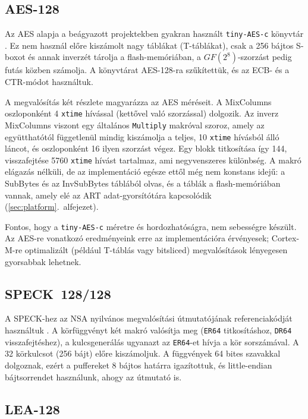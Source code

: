 \documentclass[a4paper,12pt]{report}
\theoremstyle{definition}
\theoremstyle{remark}
\begin{document}
\subsection{AES-128}

Az AES alapja a beágyazott projektekben gyakran használt \texttt{tiny-AES-c} könyvtár \cite{TinyAES}. Ez nem használ előre kiszámolt nagy táblákat (T-táblákat), csak a 256 bájtos S-boxot és annak inverzét tárolja a flash-memóriában, a $GF(2^8)$-szorzást pedig futás közben számolja. A könyvtárat AES-128-ra szűkítettük, és az ECB- és a CTR-módot használtuk.

A megvalósítás két részlete magyarázza az AES méréseit. A MixColumns oszloponként 4 \texttt{xtime} hívással (kettővel való szorzással) dolgozik. Az inverz MixColumns viszont egy általános \texttt{Multiply} makróval szoroz, amely az együtthatótól függetlenül mindig kiszámolja a teljes, 10 \texttt{xtime} hívásból álló láncot, és oszloponként 16 ilyen szorzást végez. Egy blokk titkosítása így 144, visszafejtése 5760 \texttt{xtime} hívást tartalmaz, ami negyvenszeres különbség. A makró elágazás nélküli, de az implementáció egésze ettől még nem konstans idejű: a SubBytes és az InvSubBytes táblából olvas, és a táblák a flash-memóriában vannak, amely elé az ART adat-gyorsítótára kapcsolódik (\ref{sec:platform}.~alfejezet).

Fontos, hogy a \texttt{tiny-AES-c} méretre és hordozhatóságra, nem sebességre készült. Az AES-re vonatkozó eredményeink erre az implementációra érvényesek; Cortex-M-re optimalizált (például T-táblás vagy bitsliced) megvalósítások lényegesen gyorsabbak lehetnek.

\subsection{SPECK~128/128}

A SPECK-hez az NSA nyilvános megvalósítási útmutatójának referenciakódját használtuk \cite{Beaulieu2019}. A körfüggvényt két makró valósítja meg (\texttt{ER64} titkosításhoz, \texttt{DR64} visszafejtéshez), a kulcsgenerálás ugyanazt az \texttt{ER64}-et hívja a kör sorszámával. A 32 körkulcsot (256 bájt) előre kiszámoljuk. A függvények 64 bites szavakkal dolgoznak, ezért a puffereket 8 bájtos határra igazítottuk, és little-endian bájtsorrendet használunk, ahogy az útmutató is.

\subsection{LEA-128}
\end{document}
